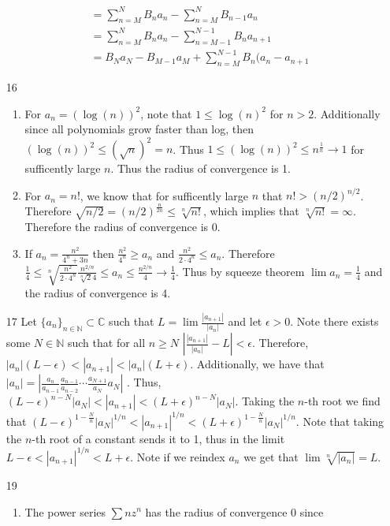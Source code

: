 \documentclass[12pt, letterpaper]{article}
\newcommand{\N}{\mathbb{N}}
\newcommand{\C}{\mathbb{C}}
\begin{document}
\begin{enumerate}
\begin{align*}
		&= \sum_{n = M}^N B_{n} a_n - \sum_{n = M}^N B_{n-1} a_n\\
		&= \sum_{n = M}^N B_{n} a_n - \sum_{n = M-1}^{N-1} B_{n} a_{n+1}\\
		&= B_N a_N - B_{M-1} a_M + \sum_{n=M}^{N-1} B_n(a_n - a_{n+1}
	\end{align*}
	\item[16]
	\begin{enumerate}
		\item For $a_n = (\log(n))^2$, note that $1 \leq \log(n)^2$ for $n > 2$.  
		Additionally since all polynomials grow faster than log, then $(\log(n))^2 \leq (\sqrt{n})^2 = n$.  Thus $1 \leq (\log(n))^2 \leq n^{\frac{1}{n}} \to 1$ for sufficently large $n$.  Thus the radius of convergence is 1.   
		\item For $a_n = n!$, we know that for sufficently large $n$ that $n! > (n/2)^{n/2}$.  Therefore $\sqrt{n/2} = (n/2)^{\frac{n}{2n}} \leq \sqrt[n]{n!}$, which implies that 
		$\sqrt[n]{n!} = \infty$.  Therefore the radius of convergence is 0.
		\item If $a_n = \frac{n^2}{4^n + 3n}$ then $\frac{n^2}{4^n} \geq a_n$ and
		$\frac{n^2}{2\cdot 4^n} \leq a_n$.  Therefore 
		$\frac{1}{4} \leq \sqrt[n]{\frac{n^2}{2\cdot 4^n}}\frac{n^{2/n}}{\sqrt[n]{2}4}
		\leq a_n \leq \frac{n^{2/n}}{4} \to \frac{1}{4}$.  Thus by squeeze theorem 
		$\lim a_n = \frac{1}{4}$ and the radius of convergence is 4.
	\end{enumerate}
	\item[17] Let $\{a_n\}_{n \in \N} \subset \C$ such that $L = \lim \frac{|a_{n+1}|}{|a_n|}$ and let $\epsilon > 0$.  Note there exists some $N \in \N$ such that for all 
	$n \geq N$ $|\frac{|a_{n+1}|}{|a_n|} - L | < \epsilon$.  Therefore, 
	$ |a_n| (L-\epsilon) < |a_{n+1}| < |a_n| (L+\epsilon)$.  Additionally, 
	we have that $|a_n| = |\frac{a_n}{a_{n-1}}\frac{a_{n-1}}{a_{n-2}}\cdots \frac{a_{N+1}}{a_N}a_N| $ .  Thus, $(L - \epsilon)^{n-N}|a_N| < |a_{n+1}| < (L+\epsilon)^{n - N}|a_N|$.  Taking the $n$-th root we find that 
	$(L - \epsilon)^{1 - \frac{N}{n}}|a_N|^{1/n} < |a_{n+1}|^{1/n} < (L+\epsilon)^{1 - \frac{N}{n}}|a_N|^{1/n}$.  Note that taking the $n$-th root of a constant sends it to 1, thus in the limit $L - \epsilon < |a_{n+1}|^{1/n} < L + \epsilon$.  Note if we reindex $a_n$ we get that $\lim \sqrt[n]{|a_n|} = L$.  
	\item[19]
	\begin{enumerate}
		\item The power series $\sum n z^n$ has the radius of convergence 0 since 

\end{enumerate}
\end{enumerate}
\end{document}
